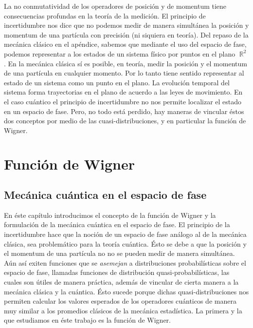\documentclass[a4paper]{report}
\DeclareMathOperator{\R}{\mathbb{R}}
\begin{document}
  La no conmutatividad de los operadores de posición y de
  momentum tiene consecuencias profundas en la teoría de la
  medición.  El principio de incertidumbre nos dice que no
  podemos medir de manera simultánea la posición y momentum
  de una partícula con precisión (ni siquiera en teoría).
  Del repaso de la mecánica clásico en el apéndice, sabemos
  que mediante el uso del espacio de fase, podemos
  representar a los estados de un sistema físico por puntos
  en el plano $\R^2$. En la mecánica clásica sí es posible,
  en teoría, medir la posición y el momentum de una
  partícula en cualquier momento. Por lo tanto tiene sentido
  representar al estado de un sistema como un punto en el
  plano. La evolución temporal del sistema forma
  trayectorias en el plano de acuerdo a las leyes de
  movimiento. En el caso cuántico el principio de
  incertidumbre no nos permite localizar el estado en un
  espacio de fase. Pero, no todo está perdido, hay maneras
  de vincular éstos dos conceptos por medio de las
  cuasi-distribuciones, y en particular la función de
  Wigner.

  \chapter{Función de Wigner}

  \section{Mecánica cuántica en el espacio de fase}

  En éste capítulo introducimos el concepto de la función de
  Wigner y la formulación de la mecánica cuántica en el
  espacio de fase. El principio de la incertidumbre hace que
  la noción de un espacio de fase análogo al de la mecánica
  clásica, sea problemático para la teoría cuántica. Ésto se
  debe a que la posición y el momentum de una partícula no
  no se pueden medir de manera simultánea. Aún así exiten
  funciones que se \textit{asemejan} a distribuciones
  probabilísticas sobre el espacio de fase, llamadas
  funciones de distribución quasi-probabilísticas, las
  cuales son útiles de manera práctica, además de vincular
  de cierta manera a la mecánica clásica y la cuántica. Ésto
  sucede porque dichas quasi-distribuciones nos permiten
  calcular los valores esperados de los operadores cuánticos
  de manera muy similar a los promedios clásicos de la
  mecánica estadística. La primera y la que estudiamos en
  éste trabajo es la función de Wigner.
\end{document}
